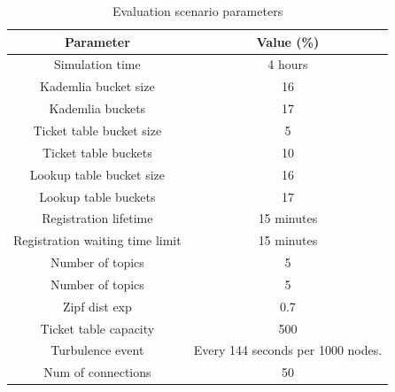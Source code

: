 \begin{table}[!hbt]
\centering
\scriptsize
\begin{tabular}{|c|c|}%
\hline
Parameter     & Value (\%) \\
\hline
\hline
Simulation time & 4 hours \\%
\hline
Kademlia bucket size & 16 \\%
\hline
Kademlia buckets & 17 \\%
\hline
Ticket table bucket size & 5 \\%
\hline
Ticket table buckets & 10 \\%
\hline
Lookup table bucket size & 16 \\%
\hline
Lookup table buckets & 17 \\%
\hline
Registration lifetime & 15 minutes \\%
\hline
Registration waiting time limit & 15 minutes \\%
\hline
Number of topics & 5 \\%
\hline
Number of topics & 5 \\%
\hline
Zipf dist exp & 0.7 \\%
\hline
Ticket table capacity & 500 \\
\hline
Turbulence event & Every 144 seconds per 1000 nodes. \\%
\hline
Num of connections & 50 \\%
\hline
\bottomrule
\end{tabular}
\vspace{2mm}
\caption{Evaluation scenario parameters}
\label{tab:param}
\vspace{-0.05in}
\end{table}

